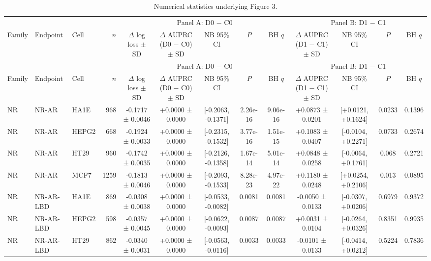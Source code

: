 \begin{landscape}
\scriptsize
\setlength{\tabcolsep}{2.7pt}
\renewcommand{\arraystretch}{1.12}
\begin{longtable}{lll r ccccc cccc}
\caption{Numerical statistics underlying Figure 3.}\label{tab:s8_figure3_statistics}\\
\toprule
& & & & \multicolumn{5}{c}{Panel A: D0 $-$ C0} & \multicolumn{4}{c}{Panel B: D1 $-$ C1} \\
\cmidrule(lr){5-9}\cmidrule(lr){10-13}
Family & Endpoint & Cell & $n$ & $\Delta$ log loss $\pm$ SD & $\Delta$ AUPRC (D0 $-$ C0) $\pm$ SD & NB 95\% CI & $P$ & BH $q$ & $\Delta$ AUPRC (D1 $-$ C1) $\pm$ SD & NB 95\% CI & $P$ & BH $q$ \\
\midrule
\endfirsthead
\toprule
& & & & \multicolumn{5}{c}{Panel A: D0 $-$ C0} & \multicolumn{4}{c}{Panel B: D1 $-$ C1} \\
\cmidrule(lr){5-9}\cmidrule(lr){10-13}
Family & Endpoint & Cell & $n$ & $\Delta$ log loss $\pm$ SD & $\Delta$ AUPRC (D0 $-$ C0) $\pm$ SD & NB 95\% CI & $P$ & BH $q$ & $\Delta$ AUPRC (D1 $-$ C1) $\pm$ SD & NB 95\% CI & $P$ & BH $q$ \\
\midrule
\endhead
NR & NR-AR & HA1E & 968 & -0.1717 ± 0.0046 & +0.0000 ± 0.0000 & [-0.2063, -0.1371] & 2.26e-16 & 9.06e-16 & +0.0873 ± 0.0201 & [+0.0121, +0.1624] & 0.0233 & 0.1396 \\
NR & NR-AR & HEPG2 & 668 & -0.1924 ± 0.0033 & +0.0000 ± 0.0000 & [-0.2315, -0.1532] & 3.77e-16 & 1.51e-15 & +0.1083 ± 0.0407 & [-0.0104, +0.2271] & 0.0733 & 0.2674 \\
NR & NR-AR & HT29 & 960 & -0.1742 ± 0.0035 & +0.0000 ± 0.0000 & [-0.2126, -0.1358] & 1.67e-14 & 5.01e-14 & +0.0848 ± 0.0258 & [-0.0064, +0.1761] & 0.068 & 0.2721 \\
NR & NR-AR & MCF7 & 1259 & -0.1813 ± 0.0046 & +0.0000 ± 0.0000 & [-0.2093, -0.1533] & 8.28e-23 & 4.97e-22 & +0.1180 ± 0.0248 & [+0.0254, +0.2106] & 0.013 & 0.0895 \\
\addlinespace[1.5pt]
NR & NR-AR-LBD & HA1E & 869 & -0.0308 ± 0.0038 & +0.0000 ± 0.0000 & [-0.0533, -0.0082] & 0.0081 & 0.0081 & -0.0050 ± 0.0133 & [-0.0307, +0.0206] & 0.6979 & 0.9372 \\
NR & NR-AR-LBD & HEPG2 & 598 & -0.0357 ± 0.0045 & +0.0000 ± 0.0000 & [-0.0622, -0.0093] & 0.0087 & 0.0087 & +0.0031 ± 0.0104 & [-0.0264, +0.0326] & 0.8351 & 0.9935 \\
NR & NR-AR-LBD & HT29 & 862 & -0.0340 ± 0.0031 & +0.0000 ± 0.0000 & [-0.0563, -0.0116] & 0.0033 & 0.0033 & -0.0101 ± 0.0133 & [-0.0414, +0.0212] & 0.5224 & 0.7836 \\

\end{longtable}
\end{landscape}
